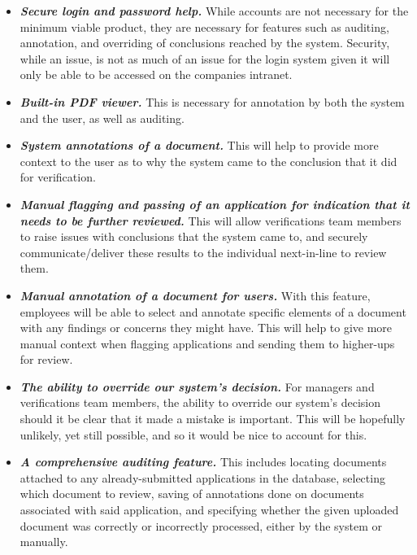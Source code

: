 \begin{itemize}[labelindent=0pt, wide]
    \item \textbf{\textit{Secure login and password help.}} While accounts are not necessary for the minimum viable product, they are necessary for features such as auditing, annotation, and overriding of conclusions reached by the system. Security, while an issue, is not as much of an issue for the login system given it will only be able to be accessed on the companies intranet.
    
    \item \textbf{\textit{Built-in PDF viewer.}} This is necessary for annotation by both the system and the user, as well as auditing.
    
    \item \textbf{\textit{System annotations of a document.}} This will help to provide more context to the user as to why the system came to the conclusion that it did for verification.
    
    \item \textbf{\textit{Manual flagging and passing of an application for indication that it needs to be further reviewed.}} This will allow verifications team members to raise issues with conclusions that the system came to, and securely communicate/deliver these results to the individual next-in-line to review them.
    
    \item \textbf{\textit{Manual annotation of a document for users.}} With this feature, employees will be able to select and annotate specific elements of a document with any findings or concerns they might have. This will help to give more manual context when flagging applications and sending them to higher-ups for review.
    
    \item \textbf{\textit{The ability to override our system's decision.}} For managers and verifications team members, the ability to override our system's decision should it be clear that it made a mistake is important. This will be hopefully unlikely, yet still possible, and so it would be nice to account for this.
    
    \item \textbf{\textit{A comprehensive auditing feature.}} This includes locating documents attached to any already-submitted applications in the database, selecting which document to review, saving of annotations done on documents associated with said application, and specifying whether the given uploaded document was correctly or incorrectly processed, either by the system or manually. 
\end{itemize}

